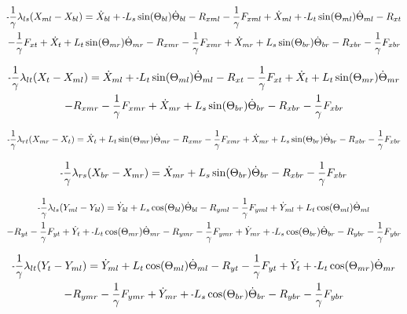 \documentclass[11pt, landscape]{article}
\newcommand{\mn}{\scalebox{0.7}[1.0]{-}}
\begin{document}
\begin{multline}
\mn\frac{1}{\gamma}\lambda_{ls}(X_{ml} - X_{bl}) =
\dot{X}_{bl} + \mn L_{s}\sin(\Theta_{bl})\dot{\Theta}_{bl} - R_{xml} - \frac{1}{\gamma}F_{xml} + \dot{X}_{ml} + \mn L_{t}\sin(\Theta_{ml})\dot{\Theta}_{ml} - R_{xt } \\
- \frac{1}{\gamma}F_{xt } + \dot{X}_{t } + L_{t}\sin(\Theta_{mr})\dot{\Theta}_{mr} - R_{xmr}
-\frac{1}{\gamma}F_{xmr} + \dot{X}_{mr} + L_{s}\sin(\Theta_{br})\dot{\Theta}_{br} - R_{xbr} - \frac{1}{\gamma}F_{xbr}
\label{eq:Ax}
\end{multline}%

\begin{multline}
\mn\frac{1}{\gamma}\lambda_{lt}(X_{t } - X_{ml}) =
\dot{X}_{ml} + \mn L_{t}\sin(\Theta_{ml})\dot{\Theta}_{ml} - R_{xt } - \frac{1}{\gamma}F_{xt } + \dot{X}_{t } + L_{t}\sin(\Theta_{mr})\dot{\Theta}_{mr} \\
- R_{xmr} - \frac{1}{\gamma}F_{xmr} + \dot{X}_{mr} + L_{s}\sin(\Theta_{br})\dot{\Theta}_{br} - R_{xbr} - \frac{1}{\gamma}F_{xbr}
\label{eq:Bx}
\end{multline}%

\begin{equation}
\mn\frac{1}{\gamma}\lambda_{rt}(X_{mr} - X_{t }) =
\dot{X}_{t } + L_{t}\sin(\Theta_{mr})\dot{\Theta}_{mr} - R_{xmr} - \frac{1}{\gamma}F_{xmr}
+ \dot{X}_{mr} + L_{s}\sin(\Theta_{br})\dot{\Theta}_{br} - R_{xbr} - \frac{1}{\gamma}F_{xbr}
\label{eq:Cx}
\end{equation}%

\begin{equation}
\mn\frac{1}{\gamma}\lambda_{rs}(X_{br} - X_{mr}) = 
\dot{X}_{mr} + L_{s}\sin(\Theta_{br})\dot{\Theta}_{br} - R_{xbr} - \frac{1}{\gamma}F_{xbr}
\label{eq:Dx}
\end{equation}%


\begin{multline}
\mn\frac{1}{\gamma}\lambda_{ls}(Y_{ml} - Y_{bl}) =
\dot{Y}_{bl} + L_{s}\cos(\Theta_{bl})\dot{\Theta}_{bl} - R_{yml} - \frac{1}{\gamma}F_{yml} + \dot{Y}_{ml} + L_{t}\cos(\Theta_{ml})\dot{\Theta}_{ml} \\
- R_{yt} - \frac{1}{\gamma}F_{yt } + \dot{Y}_{t } + \mn L_{t}\cos(\Theta_{mr})\dot{\Theta}_{mr} - R_{ymr} - \frac{1}{\gamma}F_{ymr} + \dot{Y}_{mr}
+ \mn L_{s}\cos(\Theta_{br})\dot{\Theta}_{br} - R_{ybr} - \frac{1}{\gamma}F_{ybr}
\label{eq:Ay}
\end{multline}%


\begin{multline}
\mn\frac{1}{\gamma}\lambda_{lt}(Y_{t } - Y_{ml}) =
\dot{Y}_{ml} + L_{t}\cos(\Theta_{ml})\dot{\Theta}_{ml} - R_{yt} - \frac{1}{\gamma}F_{yt } + \dot{Y}_{t } + \mn L_{t}\cos(\Theta_{mr})\dot{\Theta}_{mr} \\
- R_{ymr} - \frac{1}{\gamma}F_{ymr} + \dot{Y}_{mr} + \mn L_{s}\cos(\Theta_{br})\dot{\Theta}_{br} - R_{ybr} - \frac{1}{\gamma}F_{ybr}
\label{eq:By}
\end{multline}%
\end{document}

